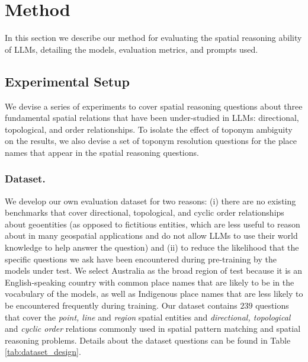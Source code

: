 \section{Method}
\label{section:method}

In this section we describe our method for evaluating the spatial reasoning ability of LLMs, detailing the models, evaluation metrics, and prompts used.


\subsection{Experimental Setup}
We devise a series of experiments to cover spatial reasoning questions about three fundamental spatial relations that have been under-studied in LLMs: directional, topological, and order relationships.
To isolate the effect of toponym ambiguity on the results, we also devise a set of toponym resolution questions for the place names that appear in the spatial reasoning questions.



\subsubsection{Dataset.} 
We develop our own evaluation dataset for two reasons: (i) there are no existing benchmarks that cover directional, topological, and cyclic order relationships about geoentities (as opposed to fictitious entities, which are less useful to reason about in many geospatial applications and do not allow LLMs to use their world knowledge to help answer the question) and (ii) to reduce the likelihood that the specific questions we ask have been encountered during pre-training by the models under test. 
We select Australia as the broad region of test because it is an English-speaking country with common place names that are likely to be in the vocabulary of the models, as well as Indigenous place names that are less likely to be encountered frequently during training. 
Our dataset contains $239$  questions that cover the \textit{point, line} and \textit{region} spatial entities and \textit{directional, topological} and \textit{cyclic order} relations commonly used in spatial pattern matching and spatial reasoning problems.
Details about the dataset questions can be found in Table \ref{tab:dataset_design}.




